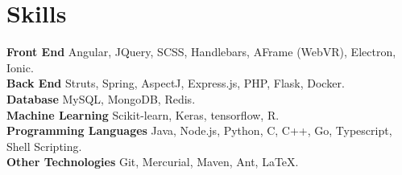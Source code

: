 \documentclass{resume}
\begin{document}
\section*{Skills}
\noindent
\textbf{Front End} Angular, JQuery, SCSS, Handlebars, AFrame (WebVR), Electron, Ionic. \\
\textbf{Back End} Struts, Spring, AspectJ, Express.js, PHP, Flask, Docker.\\
\textbf{Database} MySQL, MongoDB, Redis. \\
\textbf{Machine Learning} Scikit-learn, Keras, tensorflow, R. \\
\textbf{Programming Languages} Java, Node.js, Python, C, C++, Go, Typescript, Shell Scripting.\\
\textbf{Other Technologies} Git, Mercurial, Maven, Ant, \LaTeX.
\end{document}
